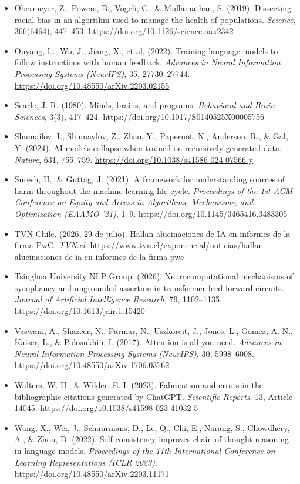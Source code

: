 \begin{itemize}[leftmargin=1.5em, label={}, itemsep=0.08ex, parsep=0pt]
    \item Obermeyer, Z., Powers, B., Vogeli, C., \& Mullainathan, S. (2019). Dissecting racial bias in an algorithm used to manage the health of populations. \textit{Science}, 366(6464), 447--453. \url{https://doi.org/10.1126/science.aax2342}
    \item Ouyang, L., Wu, J., Jiang, X., et al. (2022). Training language models to follow instructions with human feedback. \textit{Advances in Neural Information Processing Systems (NeurIPS)}, 35, 27730--27744. \url{https://doi.org/10.48550/arXiv.2203.02155}
    \item Searle, J. R. (1980). Minds, brains, and programs. \textit{Behavioral and Brain Sciences}, 3(3), 417--424. \url{https://doi.org/10.1017/S0140525X00005756}
    \item Shumailov, I., Shumaylov, Z., Zhao, Y., Papernot, N., Anderson, R., \& Gal, Y. (2024). AI models collapse when trained on recursively generated data. \textit{Nature}, 631, 755--759. \url{https://doi.org/10.1038/s41586-024-07566-y}
    \item Suresh, H., \& Guttag, J. (2021). A framework for understanding sources of harm throughout the machine learning life cycle. \textit{Proceedings of the 1st ACM Conference on Equity and Access in Algorithms, Mechanisms, and Optimization (EAAMO '21)}, 1--9. \url{https://doi.org/10.1145/3465416.3483305}
    \item TVN Chile. (2026, 29 de julio). Hallan alucinaciones de IA en informes de la firma PwC. \textit{TVN.cl}. \url{https://www.tvn.cl/exponencial/noticias/hallan-alucinaciones-de-ia-en-informes-de-la-firma-pwc}
    \item Tsinghua University NLP Group. (2026). Neurocomputational mechanisms of sycophancy and ungrounded assertion in transformer feed-forward circuits. \textit{Journal of Artificial Intelligence Research}, 79, 1102--1135. \url{https://doi.org/10.1613/jair.1.15420}
    \item Vaswani, A., Shazeer, N., Parmar, N., Uszkoreit, J., Jones, L., Gomez, A. N., Kaiser, L., \& Polosukhin, I. (2017). Attention is all you need. \textit{Advances in Neural Information Processing Systems (NeurIPS)}, 30, 5998--6008. \url{https://doi.org/10.48550/arXiv.1706.03762}
    \item Walters, W. H., \& Wilder, E. I. (2023). Fabrication and errors in the bibliographic citations generated by ChatGPT. \textit{Scientific Reports}, 13, Article 14045. \url{https://doi.org/10.1038/s41598-023-41032-5}
    \item Wang, X., Wei, J., Schuurmans, D., Le, Q., Chi, E., Narang, S., Chowdhery, A., \& Zhou, D. (2022). Self-consistency improves chain of thought reasoning in language models. \textit{Proceedings of the 11th International Conference on Learning Representations (ICLR 2023)}. \url{https://doi.org/10.48550/arXiv.2203.11171}

\end{itemize}
